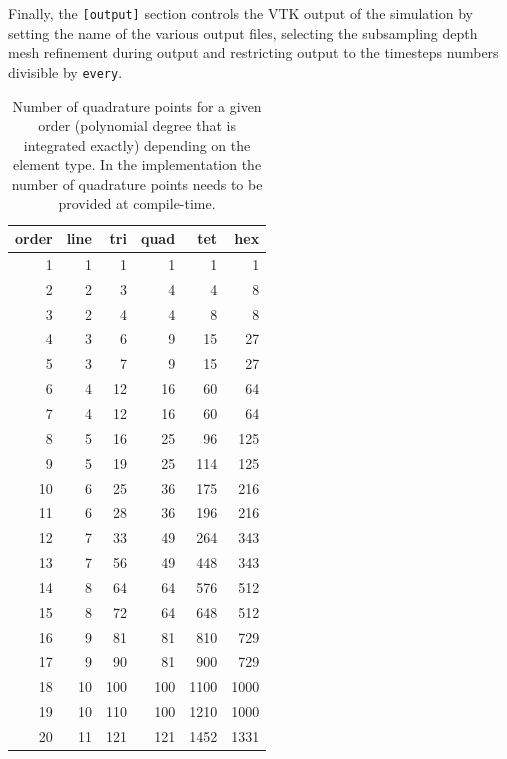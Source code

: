 \documentclass[a4paper,12pt]{article}
\theoremstyle{definition}
\begin{document}
Finally, the \lstinline{[output]} section controls the VTK output of the simulation by setting the name of the
various output files, selecting the subsampling depth mesh refinement during output and restricting output to the 
timesteps numbers divisible by \lstinline{every}.

\begin{table}
\caption{Number of quadrature points for a given order (polynomial
  degree that is integrated exactly) depending on the element type. In
the implementation the number of quadrature points needs to be
provided at compile-time.}
\label{table:quadrature}
\begin{center}
\begin{tabular}{rrrrrr}
\hline
order & line & tri & quad & tet & hex \\
 \hline
    1  &  1 &   1  &   1   &   1    &   1        \\
    2  & 2  &   3  &   4    &  4    &   8        \\
    3 &  2 &    4  &   4    &  8    &   8        \\
    4 &  3 &    6  &   9    &  15   &   27       \\
    5  & 3  &   7  &   9    &  15   &   27       \\
    6 &  4 &    12  &  16  &   60  &  64     \\
    7  &  4 &   12 &   16   &  60  &  64     \\
    8  & 5  &   16 &   25    & 96  &  125    \\
    9  &  5 &   19  &  25   &   114 & 125    \\
    10  & 6  &   25 &   36  &  175 & 216   \\
    11  &  6 &   28 &   36  &  196 & 216   \\
    12 & 7  &    33 &   49  &  264 & 343   \\
    13 & 7  &    56 &   49  &  448 & 343   \\
    14  & 8  &   64 &   64  &  576 & 512   \\
    15  &  8 &   72 &   64  &  648 & 512   \\
    16 & 9  &    81 &   81  &  810 & 729   \\
    17 &  9 &    90 &   81  &  900 & 729   \\
    18  & 10  &   100 &  100 &  1100 & 1000\\
    19 &  10 &    110 &  100  & 1210 & 1000\\
  20   &  11 &  121  & 121   &  1452 & 1331\\
  \hline
\end{tabular}
\end{center}
\end{table}



\end{document}

